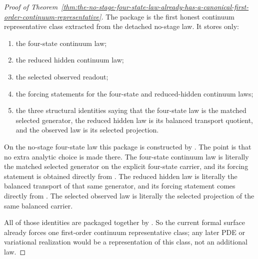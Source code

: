\begin{proof}[Proof of Theorem~\ref{thm:the-no-stage-four-state-law-already-has-a-canonical-first-order-continuum-representative}]
\label{proof:thm:the-no-stage-four-state-law-already-has-a-canonical-first-order-continuum-representative}
The package
 is the first honest continuum
representative class extracted from the detached no-stage law. It stores only:
\begin{enumerate}
\item the four-state continuum law;
\item the reduced hidden continuum law;
\item the selected observed readout;
\item the forcing statements for the four-state and reduced-hidden continuum
      laws;
\item the three structural identities saying that the four-state law is the
      matched selected generator, the reduced hidden law is its balanced
      transport quotient, and the observed law is its selected projection.
\end{enumerate}

On the no-stage four-state law this package is constructed by
. The
point is that no extra analytic choice is made there. The four-state continuum
law is literally the matched selected generator on the explicit four-state
carrier, and its forcing statement is obtained directly from
. The
reduced hidden law is literally the balanced transport
 of that same generator, and its forcing
statement comes directly from
. The
selected observed law is literally the selected projection of the same
balanced carrier.

All of those identities are packaged together by
. So the
current formal surface already forces one first-order continuum representative
class; any later PDE or variational realization would be a representation of
this class, not an additional law.
\end{proof}

